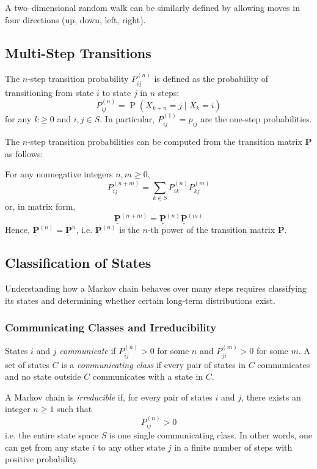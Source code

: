 \documentclass[11pt, headings=standardclasses, parskip=half, twoside]{scrartcl}
\newcommand{\matr}[1]{\underline{\boldsymbol{#1}}}
\newcommand{\Prob}{\operatorname{P}}
\begin{document}
A two–dimensional random walk can be similarly defined by allowing moves in four directions (up, down, left, right).





\subsection{Multi-Step Transitions}\label{subsec:multistep_transitions}
\begin{definition}\label{def:n-step}
  The \(n\)-step transition probability \(P_{ij}^{(n)}\) is defined as the probability of transitioning from state \(i\) to state \(j\) in \(n\) steps:
  \[
  P_{ij}^{(n)}=\Prob(X_{k+n}=j\mid X_k=i)
  \]
  for any \(k\ge0\) and \(i,j\in S\).
  In particular, \(P_{ij}^{(1)}=p_{ij}\) are the one-step probabilities.
\end{definition}
The \(n\)-step transition probabilities can be computed from the transition matrix \(\matr{P}\) as follows:
\begin{theorem}\label{thm:chapman-kolmogorov}
  For any nonnegative integers \(n,m \ge 0\),
  \[
  P_{ij}^{(n+m)}=\sum_{k\in S} P_{ik}^{(n)}P_{kj}^{(m)}
  \]
  or, in matrix form,
  \[
  \matr{P}^{(n+m)}=\matr{P}^{(n)}\matr{P}^{(m)}
  \]
  Hence, \(\matr{P}^{(n)}=\matr{P}^n\), i.e. \(\matr{P}^{(n)}\) is the \(n\)-th power of the transition matrix \(\matr{P}\).
\end{theorem}




\subsection{Classification of States}\label{subsec:classification}
Understanding how a Markov chain behaves over many steps requires classifying its states and determining whether certain long-term distributions exist.
\subsubsection{Communicating Classes and Irreducibility}
\label{subsubsec:communicating_classes}
\begin{definition}[Communication]\label{def:communicating}
  States \(i\) and \(j\) \emph{communicate} if \(P_{ij}^{(n)}>0\) for some \(n\) and \(P_{ji}^{(m)}>0\) for some \(m\).
  A set of states \(C\) is a \emph{communicating class} if every pair of states in \(C\) communicates and no state outside \(C\) communicates with a state in \(C\).
\end{definition}
\begin{definition}[Irreducibility]\label{def:irreducible}
A Markov chain is \emph{irreducible} if, for every pair of states \(i\) and \(j\), there exists an integer \(n\ge1\) such that
\[
P_{ij}^{(n)}>0
\]
i.e. the entire state space \(S\) is one single communicating class. 
In other words, one can get from any state \(i\) to any other state \(j\) in a finite number of steps with positive probability.
\end{definition}
\end{document}
